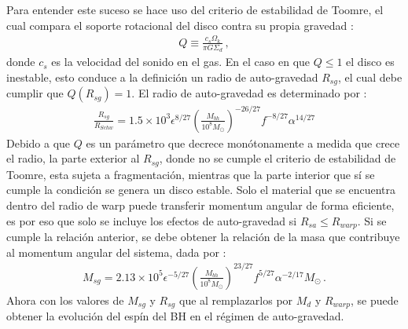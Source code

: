 %
Para entender este suceso se hace uso del criterio de estabilidad de Toomre, el cual compara el soporte rotacional del disco contra su propia gravedad \cite{Bustamante2018b}:
%
\begin{align}
    Q\equiv\frac{c_{s}\Omega_{k}}{\pi G\Sigma_{d}}\,,
    \label{eq: estabilidad_Toomre's}
\end{align}
%
%
donde $c_{s}$ es la velocidad del sonido en el gas. En el caso en que $Q\leq 1$ el disco es inestable, esto conduce a la definición un radio de auto-gravedad $R_{sg}$, el cual debe cumplir que $Q(R_{sg})=1$. El radio de auto-gravedad es determinado por \cite{fanidakis2011}:
\begin{align}
    \frac{R_{sg}}{R_{Schw}}=1.5\times 10^{3}\epsilon^{8/27}\left(\frac{M_{bh}}{10^{8}M_{\odot}} \right)^{-26/27}f^{-8/27}\alpha^{14/27}
\end{align}
%
Debido a que $Q$ es un parámetro que decrece monótonamente a medida que crece el radio, la parte exterior al $R_{sg}$, donde no se cumple el criterio de estabilidad de Toomre, esta sujeta a fragmentación, mientras que la parte interior que sí se cumple la condición se genera un disco estable. Solo el material que se encuentra dentro del radio de warp puede transferir momentum angular de forma eficiente, es por eso que solo se incluye los efectos de auto-gravedad si $R_{sa}\leq R_{warp}$. Si se cumple la relación anterior, se debe obtener la relación de la masa que contribuye al momentum angular del sistema, dada por \cite{fanidakis2011}:
%
\begin{align}
    M_{sg} = 2.13\times 10^{5}\epsilon^{-5/27}\left(\frac{M_{bh}}{10^{8}M_{\odot}} \right)^{23/27}f^{5/27}\alpha^{-2/17}M_{\odot}\,.
\end{align}
%
Ahora con los valores de $M_{sg}$ y $R_{sg}$ que al remplazarlos por $M_{d}$ y $R_{warp}$, se puede obtener la evolución del espín del BH en el régimen de auto-gravedad.


